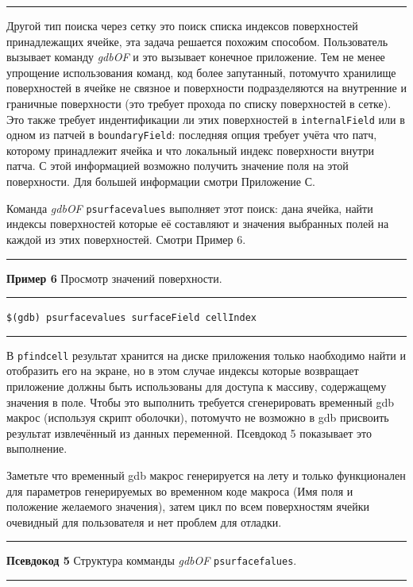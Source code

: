 \documentclass[a4paper,10pt]{book}
\begin{document}
\vspace{2 mm}
\smallskip\hrule
\vspace{5 mm}

Другой тип поиска через сетку это поиск списка индексов поверхностей принадлежащих ячейке, эта задача решается похожим способом. Пользователь
вызывает команду \textit{gdbOF} и это вызывает конечное приложение. Тем не менее упрощение использования команд, код более
запутанный, потомучто хранилище поверхностей в ячейке не связное и поверхности подразделяются на внутренние и граничные поверхности
(это требует прохода по списку поверхностей в сетке). Это также требует индентификации ли этих поверхностей в \texttt{internalField} или
в одном из патчей в \texttt{boundaryField}: последняя опция требует учёта что патч, которому принадлежит ячейка и что локальный индекс
поверхности внутри патча. С этой информацией возможно получить значение поля на этой поверхности. Для большей информации смотри Приложение С.

Команда \textit{gdbOF} \texttt{psurfacevalues} выполняет этот поиск: дана ячейка, найти индексы поверхностей которые её составляют и значения
выбранных полей на каждой из этих поверхностей. Смотри Пример 6.

\vspace{2 mm}
\hrule\smallskip
\textbf{Пример 6}\label{Prim6} Просмотр значений поверхности.
\smallskip\hrule
\vspace{2 mm}

\texttt{\$(gdb) psurfacevalues surfaceField cellIndex}

\vspace{2 mm}
\smallskip\hrule
\vspace{5 mm}

В \texttt{pfindcell} результат хранится на диске приложения только наобходимо найти и отобразить его на экране, но в этом случае индексы
которые возвращает приложение должны быть использованы для доступа к массиву, содержащему значения в поле. Чтобы это выполнить требуется
сгенерировать временный gdb макрос (используя скрипт оболочки), потомучто не возможно в gdb присвоить результат извлечённый из данных
 переменной. Псевдокод 5 показывает это выполнение.

Заметьте что временный gdb макрос генерируется на лету и только функционален для параметров генерируемых во временном коде макроса (Имя поля
и положение желаемого значения), затем цикл по всем поверхностям ячейки очевидный для пользователя и нет проблем для отладки.

\vspace{2 mm}
\hrule\smallskip
\textbf{Псевдокод 5}\label{Psevdocode5} Структура комманды \textit{gdbOF} \texttt{psurfacefalues}.
\smallskip\hrule
\vspace{2 mm}
\end{document}
